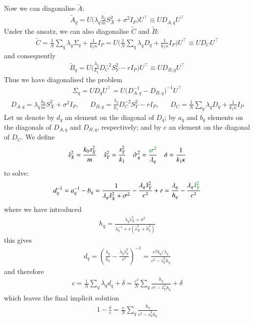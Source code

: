 \documentclass[../main.tex]{subfiles}
\begin{document}
Now we can diagonalise $\tilde A$:
\begin{align*}
    \tilde A_q 
    = 
    U \Big( \lambda_q \frac{k_0}{m} S_X^2 + \sigma^2 I_P  \Big) U^{\top}
    \equiv
    U D_{A,q} U^{\top}
\end{align*}
Under the ansatz, we can also diagonalise $\tilde C$ and $\tilde B$:
\begin{align*}
    \tilde C
    =
    \frac1N \sum_q \lambda_q \Sigma_q + \frac{1}{k_1 \kappa} I_P
    =
    U \Big( \frac1N \sum_q \lambda_q D_q + \frac{1}{k_1 \kappa} I_P \Big) U^{\top}
    \equiv
    U D_{C} U^{\top}
\end{align*}
and consequently
\begin{align*}
    \tilde B_q 
    = 
    U \Big( \frac{\lambda_q}{k_1} D_{C}^{-2} S_Y^2 - r I_P \Big) U^{\top}
    \equiv 
    U D_{B,q} U^{\top}
\end{align*}
Thus we have diagonalised the problem
\begin{align*}
    \Sigma_q
    =
    U D_q U^{\top} 
    = 
    U \Big(D_{A,q}^{-1} - D_{B,q} \Big)^{-1} U^{\top} 
\end{align*}
\begin{align*}
    D_{A,q} = \lambda_q \frac{k_0}{m} S_X^2 + \sigma^2 I_P,
    &&
    D_{B,q} = \frac{\lambda_q}{k_1} D_C^{-2} S_Y^2 - r I_P,
    &&
    D_C = \frac1N \sum_q \lambda_q D_q + \frac{1}{k_1 \kappa} I_P
\end{align*}
Let us denote by $d_q$ an element on the diagonal of $D_q$; by $a_q$ and $b_q$ elements on the diagonals of $D_{A,q}$ and $D_{B,q}$, respectively; and by $c$ an element on the diagonal of $D_C$. We define
\begin{align*}
    \hat s_X^2 = \frac{k_0 s_X^2}{m}
    &&
    \hat s_Y^2 = \frac{s_Y^2}{k_1}
    &&
    \hat \sigma^2_q = \frac{\typo{\sigma^2}}{\lambda_q}
    &&
    \delta = \frac{1}{k_1 \kappa}
\end{align*}
to solve:
\begin{align*}
    d_q^{-1}
    =
    a_q^{-1} - b_q
    =
    \frac{1}{\lambda_q \hat s_X^2 + \sigma^2} - \frac{\lambda_q \hat s_Y^2}{c^2} + r
    =
    \frac{\lambda_q}{h_q} - \frac{\lambda_q \typo{\hat s_Y^2}}{c^2}
\end{align*}
where we have introduced
\begin{align*}
    h_q 
    =
    \frac{\lambda_q \hat s_X^2 + \sigma^2 }{\lambda_q^{-1} + r (\hat s_X^2 + \hat \sigma^2_q)}
\end{align*}
this gives
\begin{align*}
    d_q = \left(\frac{\lambda_q}{h_q} - \frac{\lambda_q \hat s_Y^2}{c^2} \right)^{-1}
    =
    \frac{c^2 h_q / \lambda_q}{c^2 - \hat s_Y^2 h_q}
\end{align*}
and therefore
\begin{align*}
    c 
    = 
    \frac1N \sum_q \lambda_q d_q  + \delta
    =
    \frac{c^2}{N} \sum_q \frac{h_q}{c^2 - \hat s_Y^2 h_q} + \delta 
\end{align*}
which leaves the final implicit solution
\begin{align}
    1 - \frac{\delta}{c} = \frac{c}{N} \sum_q \frac{h_q}{c^2 - \hat s_Y^2 h_q}
    \label{eq:linear-soln}
\end{align}
\end{document}
